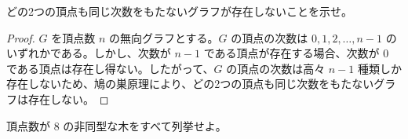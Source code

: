 \documentclass[article,paper=a4paper]{jlreq}
\begin{document}
\begin{prob}
  どの2つの頂点も同じ次数をもたないグラフが存在しないことを示せ。
\end{prob}

\begin{proof}
  $G$ を頂点数 $n$ の無向グラフとする。$G$ の頂点の次数は $0, 1, 2, \ldots, n-1$ のいずれかである。しかし、次数が $n-1$ である頂点が存在する場合、次数が $0$ である頂点は存在し得ない。したがって、$G$ の頂点の次数は高々 $n-1$ 種類しか存在しないため、鳩の巣原理により、どの2つの頂点も同じ次数をもたないグラフは存在しない。
\end{proof}

\begin{prob}
  頂点数が $8$ の非同型な木をすべて列挙せよ。
\end{prob}
\end{document}
